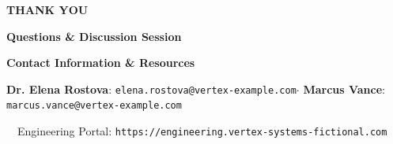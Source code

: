 \documentclass[landscape]{slides}
\begin{document}
\begin{slide}
\begin{center}
  \vspace*{0.5em}
  \begin{tcolorbox}[colback=NavyDark,colframe=TealAccent,arc=6pt,boxrule=2pt,width=0.95\textwidth]
    \centering
    \vspace{0.6em}
    {\Huge\bfseries\color{white} THANK YOU}\par\vspace{0.4em}
    {\large\color{CoralAccent}\bfseries Questions \& Discussion Session}\par\vspace{0.2em}
    \vspace{0.4em}
  \end{tcolorbox}
  
  \vspace{1.0em}
  
  \begin{tcolorbox}[colback=CardBg,colframe=BorderGray,arc=4pt,boxrule=1pt,width=0.95\textwidth]
    \centering
    \vspace{0.3em}
    {\color{NavyDark}\bfseries Contact Information \& Resources}\par\vspace{0.4em}
    {\small\color{TextDark}
      \textbf{Dr. Elena Rostova}: \texttt{elena.rostova@vertex-example.com}\quad$\cdot$\quad
      \textbf{Marcus Vance}: \texttt{marcus.vance@vertex-example.com}\par\vspace{0.2em}
      \faGlobe~~Engineering Portal: \texttt{https://engineering.vertex-systems-fictional.com}
    }
    \vspace{0.3em}
  \end{tcolorbox}
\end{center}
\end{slide}
\end{document}
